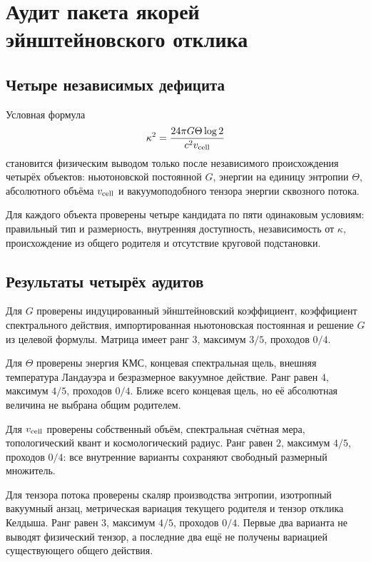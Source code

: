 \chapter{Аудит пакета якорей эйнштейновского отклика}
\label{ch:v10-einstein-anchor-package-audit}

\section{Четыре независимых дефицита}

Условная формула
\begin{equation}
 \kappa^2=\frac{24\pi G\Theta\log2}{c^2v_{\rm cell}}
 \label{eq:v10-anchor-package-scale}
\end{equation}
становится физическим выводом только после независимого происхождения
четырёх объектов: ньютоновской постоянной $G$, энергии на единицу энтропии
$\Theta$, абсолютного объёма $v_{\rm cell}$ и вакуумоподобного тензора
энергии сквозного потока.

Для каждого объекта проверены четыре кандидата по пяти одинаковым условиям:
правильный тип и размерность, внутренняя доступность, независимость от
$\kappa$, происхождение из общего родителя и отсутствие круговой подстановки.

\section{Результаты четырёх аудитов}

Для $G$ проверены индуцированный эйнштейновский коэффициент, коэффициент
спектрального действия, импортированная ньютоновская постоянная и решение
$G$ из целевой формулы. Матрица имеет ранг $3$, максимум $3/5$, проходов
$0/4$.

Для $\Theta$ проверены энергия КМС, концевая спектральная щель, внешняя
температура Ландауэра и безразмерное вакуумное действие. Ранг равен $4$,
максимум $4/5$, проходов $0/4$. Ближе всего концевая щель, но её абсолютная
величина не выбрана общим родителем.

Для $v_{\rm cell}$ проверены собственный объём, спектральная счётная мера,
топологический квант и космологический радиус. Ранг равен $2$, максимум
$4/5$, проходов $0/4$: все внутренние варианты сохраняют свободный
размерный множитель.

Для тензора потока проверены скаляр производства энтропии, изотропный
вакуумный анзац, метрическая вариация текущего родителя и тензор отклика
Келдыша. Ранг равен $3$, максимум $4/5$, проходов $0/4$. Первые два варианта
не выводят физический тензор, а последние два ещё не получены вариацией
существующего общего действия.

